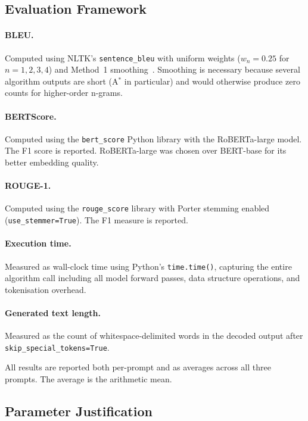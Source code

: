 \documentclass[12pt]{article}
\begin{document}
	\subsection{Evaluation Framework}
	
	\paragraph{BLEU.} Computed using NLTK's \texttt{sentence\_bleu} with uniform weights ($w_n = 0.25$ for $n = 1, 2, 3, 4$) and Method~1 smoothing~\cite{chen2014bleu_smooth}. Smoothing is necessary because several algorithm outputs are short (A$^*$ in particular) and would otherwise produce zero counts for higher-order n-grams.
	
	\paragraph{BERTScore.} Computed using the \texttt{bert\_score} Python library with the RoBERTa-large model. The F1 score is reported. RoBERTa-large was chosen over BERT-base for its better embedding quality.
	
	\paragraph{ROUGE-1.} Computed using the \texttt{rouge\_score} library with Porter stemming enabled (\texttt{use\_stemmer=True}). The F1 measure is reported.
	
	\paragraph{Execution time.} Measured as wall-clock time using Python's \texttt{time.time()}, capturing the entire algorithm call including all model forward passes, data structure operations, and tokenisation overhead.
	
	\paragraph{Generated text length.} Measured as the count of whitespace-delimited words in the decoded output after \texttt{skip\_special\_tokens=True}.
	
	All results are reported both per-prompt and as averages across all three prompts. The average is the arithmetic mean.
	
	\subsection{Parameter Justification}
	
\end{document}
